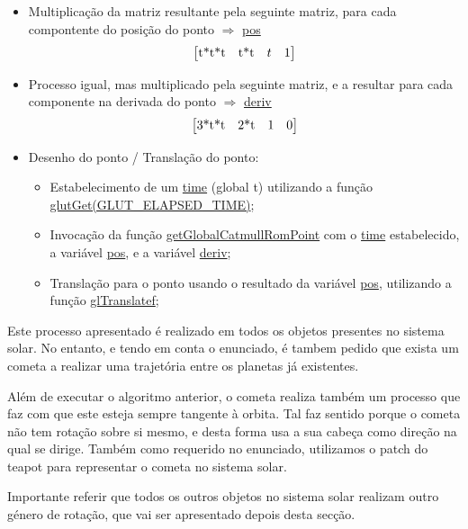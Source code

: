 \documentclass[a4paper]{article}
\begin{document}
\begin{enumerate}
\begin{itemize}
  \item Multiplicação da matriz resultante pela seguinte matriz, para cada compontente do posição do ponto $\Rightarrow$ \underline{pos}
      \begin{displaymath}
      \begin{bmatrix}
          $t*t*t$&$t*t$&t&1
      \end{bmatrix}
      \end{displaymath}
  \item Processo igual, mas multiplicado pela seguinte matriz, e a resultar para cada componente na derivada do ponto $\Rightarrow$ \underline{deriv}
      \begin{displaymath}
      \begin{bmatrix}
          $3*t*t$&$2*t$&1&0
      \end{bmatrix}
      \end{displaymath}
  \item Desenho do ponto / Translação do ponto:
  \begin{itemize}
    \item Estabelecimento de um \underline{time} (global t) utilizando a função \underline{glutGet(GLUT\_ELAPSED\_TIME)};
    \item Invocação da função \underline{getGlobalCatmullRomPoint} com o \underline{time} estabelecido, a variável \underline{pos}, e a variável \underline{deriv};
    \item Translação para o ponto usando o resultado da variável \underline{pos}, utilizando a função \underline{glTranslatef};
  \end{itemize}
  \end{itemize}
\end{enumerate}
\rmfamily

\vspace{0.5cm}

Este processo apresentado é realizado em todos os objetos presentes no sistema solar. No entanto, e tendo em conta o enunciado, é tambem pedido que exista um cometa a realizar uma trajetória entre os planetas já existentes.

Além de executar o algoritmo anterior, o cometa realiza também um processo que faz com que este esteja sempre tangente à orbita. Tal faz sentido porque o cometa não tem rotação sobre si mesmo, e desta forma usa a sua cabeça como direção na qual se dirige. Também como requerido no enunciado, utilizamos o patch do teapot para representar o cometa no sistema solar.

Importante referir que todos os outros objetos no sistema solar realizam outro género de rotação, que vai ser apresentado depois desta secção.
\end{document}
